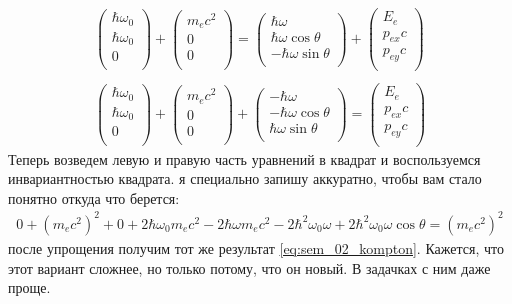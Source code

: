 \documentclass[12pt]{article}
\begin{document}
\begin{gather*}
    \left( \begin{matrix}
    \hbar\omega_0\\
    \hbar\omega_0\\
    0\\
    \end{matrix}
    \right) + 
    \left( \begin{matrix}
    m_ec^2\\
    0\\
    0\\
    \end{matrix}
    \right) =
    \left( \begin{matrix}
    \hbar\omega\\
    \hbar\omega \cos{\theta}\\
    -\hbar\omega \sin{\theta}\\
    \end{matrix}
    \right) + 
    \left( \begin{matrix}
    E_e\\
    p_{ex}c\\
    p_{ey}c\\
    \end{matrix}
    \right)\\
    \\
        \left( \begin{matrix}
    \hbar\omega_0\\
    \hbar\omega_0\\
    0\\
    \end{matrix}
    \right) + 
    \left( \begin{matrix}
    m_ec^2\\
    0\\
    0\\
    \end{matrix}
    \right)
    +\left( \begin{matrix}
    -\hbar\omega\\
    -\hbar\omega \cos{\theta}\\
    \hbar\omega \sin{\theta}\\
    \end{matrix}
    \right)=
    \left( \begin{matrix}
    E_e\\
    p_{ex}c\\
    p_{ey}c\\
    \end{matrix}
    \right)
\end{gather*}
Теперь возведем левую и правую часть уравнений в квадрат и воспользуемся инвариантностью квадрата. я специально запишу аккуратно, чтобы вам стало понятно откуда что берется:
\begin{gather*}
    0+(m_ec^2)^2 + 0 + 2\hbar\omega_0 m_ec^2 - 2\hbar\omega m_ec^2- 2\hbar^2\omega_0\omega + 2\hbar^2\omega_0\omega\cos{\theta} = (m_ec^2)^2
\end{gather*}
после упрощения получим тот же результат \ref{eq:sem_02_kompton}. Кажется, что этот вариант сложнее, но только потому, что он новый. В задачках с ним даже проще.
\end{document}
